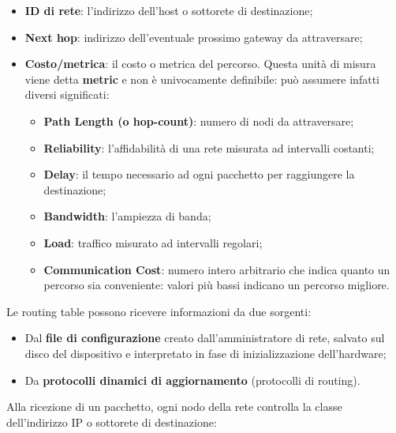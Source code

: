 \documentclass{article}
\begin{document}
            \begin{itemize}
                \item \textbf{ID di rete}: l’indirizzo dell’host o sottorete di destinazione;
                \item \textbf{Next hop}: indirizzo dell’eventuale prossimo gateway da attraversare;
                \item \textbf{Costo/metrica}: il costo o metrica del percorso. Questa unità di misura viene detta
                \textbf{metric} e non è univocamente definibile: può assumere infatti diversi significati:
                    \begin{itemize}
                        \item \textbf{Path Length (o hop-count)}: numero di nodi da attraversare;
                        \item \textbf{Reliability}: l’affidabilità di una rete misurata ad intervalli costanti;
                        \item \textbf{Delay}: il tempo necessario ad ogni pacchetto per raggiungere la destinazione;
                        \item \textbf{Bandwidth}: l’ampiezza di banda;
                        \item \textbf{Load}: traffico misurato ad intervalli regolari;
                        \item \textbf{Communication Cost}: numero intero arbitrario che indica quanto un percorso
                        sia conveniente: valori più bassi indicano un percorso migliore.
                    \end{itemize}
            \end{itemize}

            Le routing table possono ricevere informazioni da due sorgenti:

            \begin{itemize}
                \item Dal \textbf{file di configurazione} creato dall’amministratore di rete, salvato sul disco del
                dispositivo e interpretato in fase di inizializzazione dell’hardware;
                \item Da \textbf{protocolli dinamici di aggiornamento} (protocolli di routing).
            \end{itemize}

            Alla ricezione di un pacchetto, ogni nodo della rete controlla la classe dell’indirizzo IP o
            sottorete di destinazione:
\end{document}
